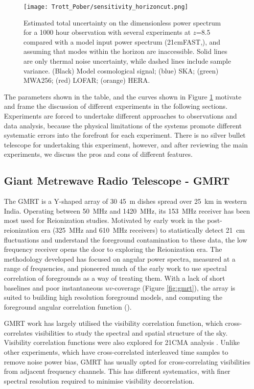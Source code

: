 \begin{figure}[ht]
\centering
\texttt{[image: Trott\_Pober/sensitivity\_horizoncut.png]}
\caption{Estimated total uncertainty on the dimensionless power spectrum for a 1000 hour observation with several experiments at $z$=8.5 compared with a model input power spectrum (21cmFAST,\cite{mesinger11}), and assuming that modes within the horizon are inaccessible. Solid lines are only thermal noise uncertainty, while dashed lines include sample variance. (Black) Model cosmological signal; (blue) SKA; (green) MWA256; (red) LOFAR; (orange) HERA.}\label{fig:current}
\end{figure}
The parameters shown in the table, and the curves shown in Figure \ref{fig:current} motivate and frame the discussion of different experiments in the following sections. Experiments are forced to undertake different approaches to observations and data analysis, because the physical limitations of the systems promote different systematic errors into the forefront for each experiment. There is no silver bullet telescope for undertaking this experiment, however, and after reviewing the main experiments, we discuss the pros and cons of different features.

\subsection{Giant Metrewave Radio Telescope - GMRT}
\label{sec:gmrt}
The GMRT \cite{swarup91} is a Y-shaped array of 30 45~m dishes spread over 25~km in western India. Operating between 50~MHz and 1420~MHz, its 153~MHz receiver has been most used for Reionization studies. Motivated by early work in the post-reionization era (325~MHz and 610~MHz receivers) to statistically detect 21~cm fluctuations and understand the foreground contamination to these data, the low frequency receiver opens the door to exploring the Reionization era. The methodology developed has focused on angular power spectra, measured at a range of frequencies, and pioneered much of the early work to use spectral correlation of foregrounds as a way of treating them. With a lack of short baselines and poor instantaneous $uv$-coverage (Figure \ref{fig:gmrt}), the array is suited to building high resolution foreground models, and computing the foreground angular correlation function (\cite{rana19}).

GMRT work has largely utilised the visibility correlation function, which cross-correlates visibilities to study the spectral and spatial structure of the sky. Visibility correlation functions were also explored for 21CMA analysis \cite{zheng12}. Unlike other experiments, which have cross-correlated interleaved time samples to remove noise power bias, GMRT has usually opted for cross-correlating visibilities from adjacent frequency channels. This has different systematics, with finer spectral resolution required to minimise visibility decorrelation.

